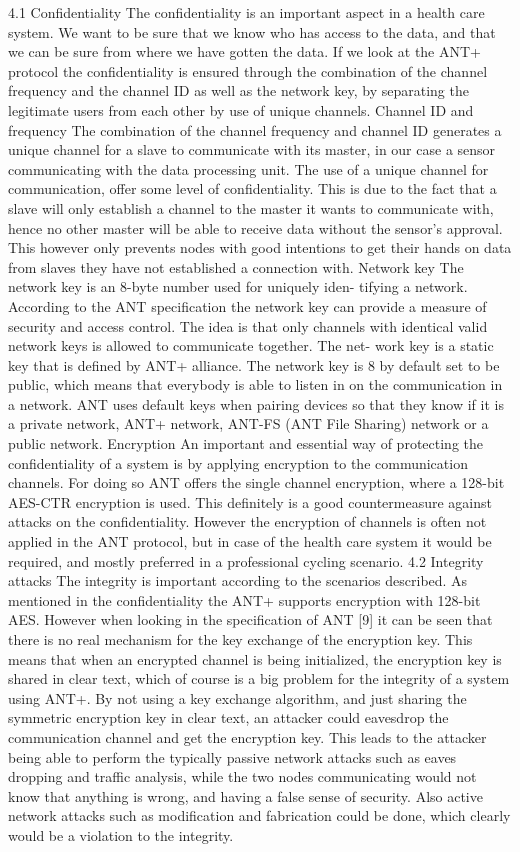 4.1 Confidentiality
The confidentiality is an important aspect in a health care system. We want to be sure that we know who has access to the data, and that we can be sure from where we have gotten the data. If we look at the ANT+ protocol the confidentiality is ensured through the combination of the channel frequency and the channel ID as well as the network key, by separating the legitimate users from each other by use of unique channels.
Channel ID and frequency The combination of the channel frequency and channel ID generates a unique channel for a slave to communicate with its master, in our case a sensor communicating with the data processing unit. The use of a unique channel for communication, offer some level of confidentiality. This is due to the fact that a slave will only establish a channel to the master it wants to communicate with, hence no other master will be able to receive data without the sensor’s approval. This however only prevents nodes with good intentions to get their hands on data from slaves they have not established a connection with.
Network key The network key is an 8-byte number used for uniquely iden- tifying a network. According to the ANT specification the network key can provide a measure of security and access control. The idea is that only channels with identical valid network keys is allowed to communicate together. The net- work key is a static key that is defined by ANT+ alliance. The network key is
8
by default set to be public, which means that everybody is able to listen in on the communication in a network. ANT uses default keys when pairing devices so that they know if it is a private network, ANT+ network, ANT-FS (ANT File Sharing) network or a public network.
Encryption An important and essential way of protecting the confidentiality of a system is by applying encryption to the communication channels. For doing so ANT offers the single channel encryption, where a 128-bit AES-CTR encryption is used. This definitely is a good countermeasure against attacks on the confidentiality. However the encryption of channels is often not applied in the ANT protocol, but in case of the health care system it would be required, and mostly preferred in a professional cycling scenario.
4.2 Integrity attacks
The integrity is important according to the scenarios described. As mentioned in the confidentiality the ANT+ supports encryption with 128-bit AES. However when looking in the specification of ANT [9] it can be seen that there is no real mechanism for the key exchange of the encryption key. This means that when an encrypted channel is being initialized, the encryption key is shared in clear text, which of course is a big problem for the integrity of a system using ANT+. By not using a key exchange algorithm, and just sharing the symmetric encryption key in clear text, an attacker could eavesdrop the communication channel and get the encryption key. This leads to the attacker being able to perform the typically passive network attacks such as eaves dropping and traffic analysis, while the two nodes communicating would not know that anything is wrong, and having a false sense of security. Also active network attacks such as modification and fabrication could be done, which clearly would be a violation to the integrity.
